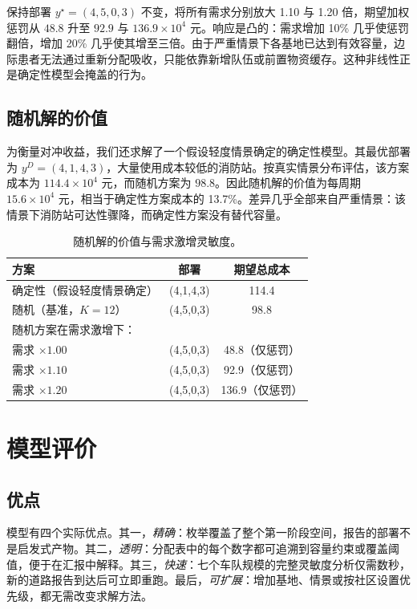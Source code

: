 \documentclass[12pt,a4paper,fontset=windows]{ctexart}
\begin{document}
保持部署 $y^{\star}=(4,5,0,3)$ 不变，将所有需求分别放大 1.10 与 1.20 倍，期望加权惩罚从 $48.8$ 升至 $92.9$ 与 $136.9\times10^{4}$ 元。响应是凸的：需求增加 10\% 几乎使惩罚翻倍，增加 20\% 几乎使其增至三倍。由于严重情景下各基地已达到有效容量，边际患者无法通过重新分配吸收，只能依靠新增队伍或前置物资缓存。这种非线性正是确定性模型会掩盖的行为。

\subsection{随机解的价值}

为衡量对冲收益，我们还求解了一个假设轻度情景确定的确定性模型。其最优部署为 $y^{D}=(4,1,4,3)$，大量使用成本较低的消防站。按真实情景分布评估，该方案成本为 $114.4\times10^{4}$ 元，而随机方案为 $98.8$。因此随机解的价值为每周期 $15.6\times10^{4}$ 元，相当于确定性方案成本的 13.7\%。差异几乎全部来自严重情景：该情景下消防站可达性骤降，而确定性方案没有替代容量。

\begin{table}[!ht]
\centering
\caption{随机解的价值与需求激增灵敏度。}
\label{tab:vss}
\small
\begin{tabular}{lcc}
\toprule
方案 & 部署 & 期望总成本 \\
\midrule
确定性（假设轻度情景确定） & (4,1,4,3) & 114.4 \\
随机（基准，$K=12$）        & (4,5,0,3) & 98.8 \\
\midrule
\multicolumn{3}{l}{随机方案在需求激增下：} \\
需求 $\times1.00$ & (4,5,0,3) & 48.8（仅惩罚） \\
需求 $\times1.10$ & (4,5,0,3) & 92.9（仅惩罚） \\
需求 $\times1.20$ & (4,5,0,3) & 136.9（仅惩罚） \\
\bottomrule
\end{tabular}
\end{table}

\section{模型评价}

\subsection{优点}

模型有四个实际优点。其一，\emph{精确}：枚举覆盖了整个第一阶段空间，报告的部署不是启发式产物。其二，\emph{透明}：分配表中的每个数字都可追溯到容量约束或覆盖阈值，便于在汇报中解释。其三，\emph{快速}：七个车队规模的完整灵敏度分析仅需数秒，新的道路报告到达后可立即重跑。最后，\emph{可扩展}：增加基地、情景或按社区设置优先级，都无需改变求解方法。
\end{document}
